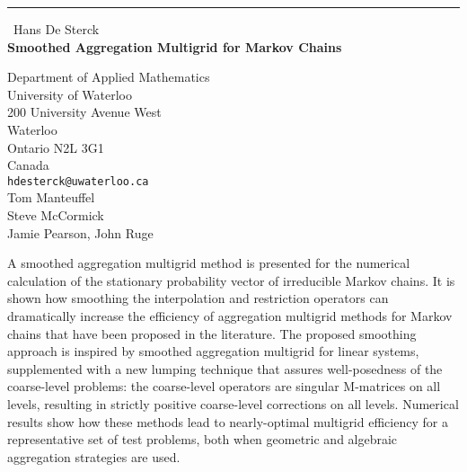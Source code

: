 \documentclass{report}
\begin{document}
\begin{center}
\rule{6in}{1pt} \
{\large Hans De Sterck \\
{\bf Smoothed Aggregation Multigrid for Markov Chains}}

Department of Applied Mathematics \\ University of Waterloo \\ 200 University Avenue West \\ Waterloo \\ Ontario N2L 3G1 \\ Canada
\\
{\tt hdesterck@uwaterloo.ca}\\
Tom Manteuffel\\
Steve McCormick\\
	Jamie Pearson, John Ruge
	\end{center}

A smoothed aggregation multigrid method is presented for the numerical
calculation of the stationary probability
vector of irreducible Markov chains. It is shown how smoothing the
interpolation and restriction operators can dramatically increase the
efficiency of aggregation multigrid methods for Markov chains that have
been proposed in the literature.
The proposed smoothing approach is inspired by smoothed aggregation
multigrid for linear systems, supplemented with a new lumping technique
that assures well-posedness of the coarse-level problems: the
coarse-level operators are singular M-matrices on all levels, resulting
in strictly positive coarse-level corrections on all levels. Numerical
results show how these methods lead to nearly-optimal multigrid
efficiency for a representative set of test problems, both when geometric
and algebraic aggregation strategies are used.
\end{document}
